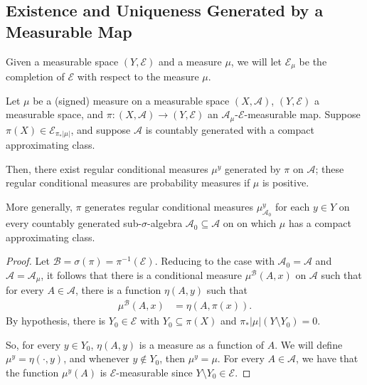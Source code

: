 \documentclass[10pt]{mypackage}
\begin{document}
\subsection{Existence and Uniqueness Generated by a Measurable Map}%
Given a measurable space $\left( Y,\mathcal{E} \right)$ and a measure $\mu$, we will let $\mathcal{E}_{\mu}$ be the completion of $\mathcal{E}$ with respect to the measure $\mu$.
\begin{theorem}
  Let $\mu$ be a (signed) measure on a measurable space $\left( X,\mathcal{A} \right)$, $\left( Y,\mathcal{E} \right)$ a measurable space, and $\pi\colon \left( X,\mathcal{A} \right)\to \left( Y,\mathcal{E} \right)$ an $\mathcal{A}_{\mu}$-$\mathcal{E}$-measurable map. Suppose $\pi(X)\in \mathcal{E}_{\pi_{\ast}\left\vert \mu \right\vert}$, and suppose $\mathcal{A}$ is countably generated with a compact approximating class.

  Then, there exist regular conditional measures $\mu^y$ generated by $\pi$ on $\mathcal{A}$; these regular conditional measures are probability measures if $\mu$ is positive.

  More generally, $\pi$ generates regular conditional measures $\mu^y_{\mathcal{A}_0}$ for each $y\in Y$ on every countably generated sub-$\sigma$-algebra $\mathcal{A}_0\subseteq \mathcal{A}$ on on which $\mu$ has a compact approximating class.
\end{theorem}
\begin{proof}
  Let $\mathcal{B} = \sigma\left( \pi \right) = \pi^{-1}\left( \mathcal{E} \right)$. Reducing to the case with $\mathcal{A}_0 = \mathcal{A}$ and $\mathcal{A} = \mathcal{A}_{\mu}$, it follows that there is a conditional measure $\mu^{\mathcal{B}}\left( A,x \right)$ on $\mathcal{A}$ such that for every $A\in \mathcal{A}$, there is a function $\eta\left( A,y \right)$ such that
  \begin{align*}
    \mu^{\mathcal{B}}\left( A,x \right) &= \eta\left( A,\pi(x) \right).
  \end{align*}
  By hypothesis, there is $Y_0\in \mathcal{E}$ with $Y_0\subseteq \pi(X)$ and $\pi_{\ast}\left\vert \mu \right\vert\left( Y\setminus Y_0 \right) = 0$.

  So, for every $y\in Y_0$, $\eta\left( A,y \right)$ is a measure as a function of $A$. We will define $\mu^y = \eta\left( \cdot,y \right)$, and whenever $y\notin Y_0$, then $\mu^y = \mu$. For every $A\in \mathcal{A}$, we have that the function $\mu^y\left( A \right)$ is $\mathcal{E}$-measurable since $Y\setminus Y_0\in \mathcal{E}$. 
\end{proof}
\end{document}
